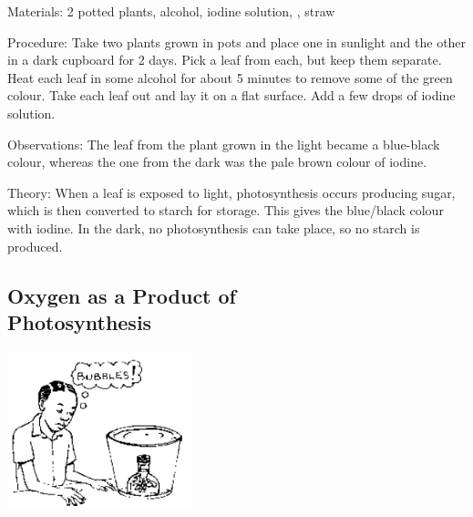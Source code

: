 \begin{multicols}{2}
\begin{description*}
\item[Materials:]{2 potted plants, alcohol, iodine solution, , straw}
\item[Procedure:]{Take two plants grown in pots and place one in sunlight and the other in a dark cupboard
for 2 days. Pick a leaf from each, but keep them separate. Heat each leaf in some alcohol for about 5 minutes to remove some of the green colour. Take each leaf out and lay it on
a flat surface. Add a few drops of iodine solution.}
\item[Observations:]{The leaf from the plant grown in the light became a blue-black colour, whereas the one
from the dark was the pale brown colour of iodine.}
\item[Theory:]{When a leaf is exposed to light, photosynthesis occurs producing sugar, which is then
converted to starch for storage. This gives the blue/black colour with iodine. In the dark, no
photosynthesis can take place, so no starch is produced.}
\end{description*}

\vfill
\columnbreak

\subsection[Oxygen as a Product of Photosynthesis]{Oxygen as a Product of \hfill \\ Photosynthesis}  %

\begin{center}
\includegraphics[width=0.4\textwidth]{./img/source/photo-gas.png}
\end{center}


\end{multicols}
